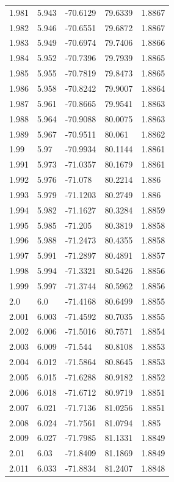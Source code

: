 \begin{tabular}{lllll}
1.981 & 5.943 & -70.6129 & 79.6339 & 1.8867 \\
1.982 & 5.946 & -70.6551 & 79.6872 & 1.8867 \\
1.983 & 5.949 & -70.6974 & 79.7406 & 1.8866 \\
1.984 & 5.952 & -70.7396 & 79.7939 & 1.8865 \\
1.985 & 5.955 & -70.7819 & 79.8473 & 1.8865 \\
1.986 & 5.958 & -70.8242 & 79.9007 & 1.8864 \\
1.987 & 5.961 & -70.8665 & 79.9541 & 1.8863 \\
1.988 & 5.964 & -70.9088 & 80.0075 & 1.8863 \\
1.989 & 5.967 & -70.9511 & 80.061 & 1.8862 \\
1.99 & 5.97 & -70.9934 & 80.1144 & 1.8861 \\
1.991 & 5.973 & -71.0357 & 80.1679 & 1.8861 \\
1.992 & 5.976 & -71.078 & 80.2214 & 1.886 \\
1.993 & 5.979 & -71.1203 & 80.2749 & 1.886 \\
1.994 & 5.982 & -71.1627 & 80.3284 & 1.8859 \\
1.995 & 5.985 & -71.205 & 80.3819 & 1.8858 \\
1.996 & 5.988 & -71.2473 & 80.4355 & 1.8858 \\
1.997 & 5.991 & -71.2897 & 80.4891 & 1.8857 \\
1.998 & 5.994 & -71.3321 & 80.5426 & 1.8856 \\
1.999 & 5.997 & -71.3744 & 80.5962 & 1.8856 \\
2.0 & 6.0 & -71.4168 & 80.6499 & 1.8855 \\
2.001 & 6.003 & -71.4592 & 80.7035 & 1.8855 \\
2.002 & 6.006 & -71.5016 & 80.7571 & 1.8854 \\
2.003 & 6.009 & -71.544 & 80.8108 & 1.8853 \\
2.004 & 6.012 & -71.5864 & 80.8645 & 1.8853 \\
2.005 & 6.015 & -71.6288 & 80.9182 & 1.8852 \\
2.006 & 6.018 & -71.6712 & 80.9719 & 1.8851 \\
2.007 & 6.021 & -71.7136 & 81.0256 & 1.8851 \\
2.008 & 6.024 & -71.7561 & 81.0794 & 1.885 \\
2.009 & 6.027 & -71.7985 & 81.1331 & 1.8849 \\
2.01 & 6.03 & -71.8409 & 81.1869 & 1.8849 \\
2.011 & 6.033 & -71.8834 & 81.2407 & 1.8848 \\

\end{tabular}
